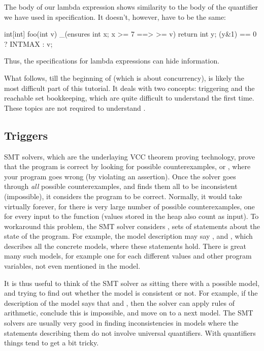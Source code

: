 \begin{note}
The body of our lambda expression shows similarity to the body
of the quantifier we have used in specification.
It doesn't, however, have to be the same:
\begin{VCC}
int[int] foo(int v)
  _(ensures \forall int x; x >= 7 ==> \result[x] >= v)
{
  return \lambda int y; (y&1) == 0 ? INTMAX : v;
}
\end{VCC}
Thus, the specifications for lambda expressions can hide information.
\end{note}

\begin{note}
What follows, till the beginning of  (which is about concurrency), is likely the most difficult part of this tutorial.
It deals with two concepts: triggering and the reachable set
bookkeeping, which are quite difficult to understand the first time.
These topics are not required to understand .
\end{note}

\subsection{Triggers}

SMT solvers, which are the underlaying VCC theorem proving technology,
prove that the program is correct by looking for possible counterexamples,
or , where your program goes wrong (\eg by violating an assertion).
Once the solver goes through \emph{all} possible counterexamples, and finds them
all to be inconsistent (\ie impossible),
it considers the program to be correct.
Normally, it would take virtually forever, for there is very large number of
possible counterexamples, one for every input to the function (values stored in
the heap also count as input).
To workaround this problem, the SMT solver considers
, \ie 
sets of statements about the state of the program.
For example, the model description may say , 
and , which describes all the concrete models, where
these statements hold. There is great many such models,
for example one for each different values  and other program variables,
not even mentioned in the model.

It is thus useful to think of the SMT solver as sitting there with
a possible model, and trying to find out whether the model is consistent or not.
For example, if the description of the model says that  and
, then the solver can apply rules of arithmetic, conclude this is
impossible, and move on to a next model.
The SMT solvers are usually very good in finding inconsistencies in models
where the statements describing them do not involve universal quantifiers.
With quantifiers things tend to get a bit tricky.

